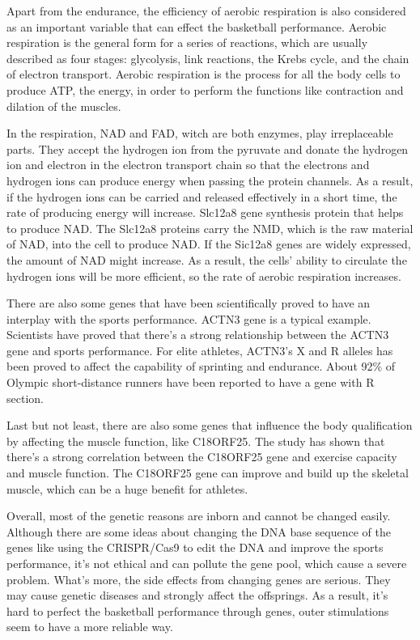 \documentclass[man,floatsintext]{apa7}
\begin{document}
Apart from the endurance, the efficiency of aerobic respiration is also considered as an important variable that can effect the basketball performance. Aerobic respiration is the general form for a series of reactions, which are usually described as four stages: glycolysis, link reactions, the Krebs cycle, and the chain of electron transport. Aerobic respiration is the process for all the body cells to produce ATP, the energy, in order to perform the functions like contraction and dilation of the muscles. 

In the respiration, NAD and FAD, witch are both enzymes, play irreplaceable parts. They accept the hydrogen ion from the pyruvate and donate the hydrogen ion and electron in the electron transport chain so that the electrons and hydrogen ions can produce energy when passing the protein channels. As a result, if the hydrogen ions can be carried and released effectively in a short time, the rate of producing energy will increase. Slc12a8 gene synthesis protein that helps to produce NAD. The Slc12a8 proteins carry the NMD, which is the raw material of NAD, into the cell to produce NAD. \autocite{grozioSlc12a8NicotinamideMononucleotide2019} If the Sic12a8 genes are widely expressed, the amount of NAD might increase. As a result, the cells' ability to circulate the hydrogen ions will be more efficient, so the rate of aerobic respiration increases.

There are also some genes that have been scientifically proved to have an interplay with the sports performance. ACTN3 gene is a typical example. Scientists have proved that there's a strong relationship between the ACTN3 gene and sports performance. For elite athletes, ACTN3's X and R alleles has been proved to affect the capability of sprinting and endurance. About 92\% of Olympic short-distance runners have been reported to have a gene with R section.\autocite{goelACTN3AthleteGene2007}

Last but not least, there are also some genes that influence the body qualification by affecting the muscle function, like C18ORF25. The study has shown that there's a strong correlation between the C18ORF25 gene and exercise capacity and muscle function. The C18ORF25 gene can improve and build up the skeletal muscle, which can be a huge benefit for athletes.\autocite{blazevPhosphoproteomicsThreeExercise2022}

Overall, most of the genetic reasons are inborn and cannot be changed easily. Although there are some ideas about changing the DNA base sequence of the genes like using the CRISPR/Cas9 to edit the DNA and improve the sports performance, it's not ethical and can pollute the gene pool, which cause a severe problem. What's more, the side effects from changing genes are serious. They may cause genetic diseases and strongly affect the offsprings. As a result, it's hard to perfect the basketball performance through genes, outer stimulations seem to have a more reliable way. 
\end{document}
